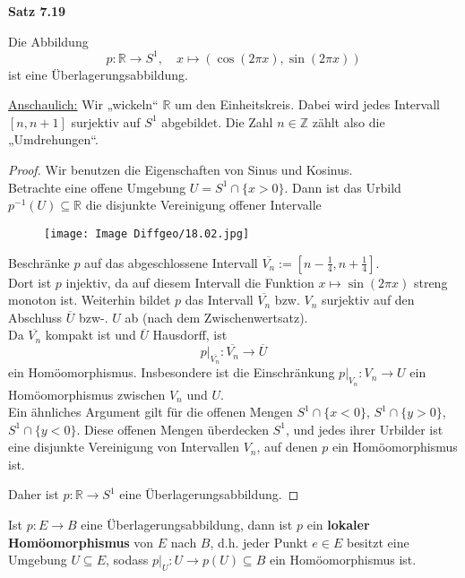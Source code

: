 \documentclass[fleqn, 12pt, letterpaper]{article}
\begin{document}
\textbf{Satz 7.19}

Die Abbildung
\[
p : \mathbb{R} \to S^1, \quad x \mapsto (\cos(2\pi x), \sin(2\pi x))
\]
ist eine {Überlagerungsabbildung}.

\vspace{1em}
\underline{Anschaulich:} 
Wir „wickeln“ \( \mathbb{R} \) um den Einheitskreis. Dabei wird jedes Intervall \( [n, n+1] \) surjektiv auf \( S^1 \) abgebildet. Die Zahl \( n \in \mathbb{Z} \) zählt also die „Umdrehungen“.
\begin{proof}
    Wir benutzen die Eigenschaften von Sinus und Kosinus. \\
Betrachte eine offene Umgebung \( U = S^1 \cap \{x>0\} \). Dann ist das Urbild \( p^{-1}(U) \subseteq \mathbb{R} \) die disjunkte Vereinigung offener Intervalle

  \begin{figure}[H]
    \centering
    \texttt{[image: Image Diffgeo/18.02.jpg]}
 \end{figure}
Beschränke \( p \) auf das abgeschlossene Intervall \( \overline{V_n}:=[n-\frac{1}{4},n+\frac{1}{4}] \). \\
Dort ist \( p \) injektiv, da auf diesem Intervall die Funktion \( x \mapsto \sin(2\pi x) \) streng monoton ist. Weiterhin bildet \( p \) das Intervall \( \overline{V_n} \) bzw. $V_n$ surjektiv auf den Abschluss \( \overline{U} \) bzw-. $U$ ab (nach dem Zwischenwertsatz).\\

Da \( \overline{V_n} \) kompakt ist und \( \overline{U} \) Hausdorff, ist
\[
p|_{\overline{V_n}} : \overline{V_n} \to \overline{U}
\]
ein Homöomorphismus. Insbesondere ist die Einschränkung \( p|_{V_n} : V_n \to U \) ein Homöomorphismus zwischen $V_n$ und $U$.\\

Ein ähnliches Argument gilt für die offenen Mengen \( S^1 \cap \{x < 0\} \), \( S^1 \cap \{y > 0\} \), \( S^1 \cap \{y < 0\} \). Diese offenen Mengen überdecken \( S^1 \), und jedes ihrer Urbilder ist eine disjunkte Vereinigung von Intervallen \( V_n \), auf denen \( p \) ein Homöomorphismus ist.

Daher ist \( p : \mathbb{R} \to S^1 \) eine Überlagerungsabbildung.
\end{proof}
\vspace{1em}

Ist \( p : E \to B \) eine Überlagerungsabbildung, dann ist \( p \) ein \textbf{lokaler Homöomorphismus} von \( E \) nach \( B \), d.h. jeder Punkt \( e \in E \) besitzt eine Umgebung \( U \subseteq E \), sodass \( p|_U : U \to p(U) \subseteq B \) ein Homöomorphismus ist.\\
\end{document}
